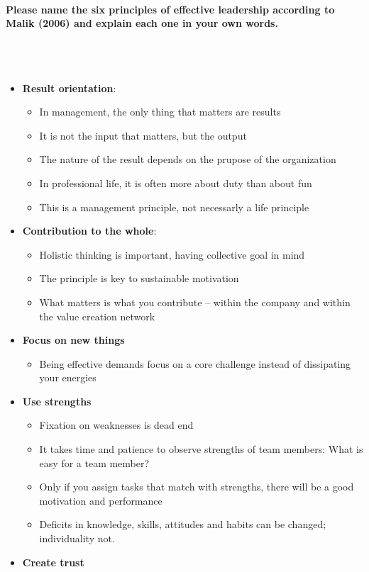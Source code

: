 \documentclass[10pt,a4paper,noendnumber=true]{scrartcl}
\newcommand{\properparagraph}[1]{\paragraph{\textcolor{Emerald}{#1}}\mbox{}\\}
\begin{document}
\properparagraph{Please name the six principles of effective leadership according to Malik (2006) and explain each one in your own words.}
\\[-6ex]
\begin{itemize}
	\item \textbf{Result orientation}:
		\begin{itemize}
			\item In management, the only thing that matters are results
			\item It is not the input that matters, but the output
			\item The nature of the result depends on the prupose of the organization
			\item In professional life, it is often more about duty than about fun
			\item This is a management principle, not necessarly a life principle
		\end{itemize}
		\item \textbf{Contribution to the whole}:
		\begin{itemize}
			\item Holistic thinking is important, having collective goal in mind
			\item The principle is key to sustainable motivation
			\item What matters is what you contribute -- within the company and within the value creation network
		\end{itemize}
		\item \textbf{Focus on new things}
		\begin{itemize}
			\item Being effective demands focus on a core challenge instead of dissipating your energies
		\end{itemize}
		\item \textbf{Use strengths}
		\begin{itemize}
			\item Fixation on weaknesses is dead end
			\item It takes time and patience to observe strengths of team members: What is easy for a team member?
			\item Only if you assign tasks that match with strengths, there will be a good motivation and performance
			\item Deficits in knowledge, skills, attitudes and habits can be changed; individuality not.
		\end{itemize}
		\item\textbf{Create trust}

\end{itemize}
\end{document}
